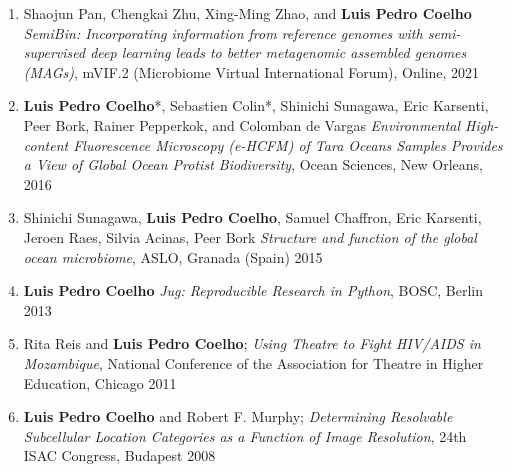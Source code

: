 \documentclass{article}
\begin{document}
\begin{enumerate}
\item Shaojun Pan, Chengkai Zhu, Xing-Ming Zhao, and \textbf{Luis Pedro
Coelho} \emph{SemiBin: Incorporating information from reference genomes with
semi-supervised deep learning leads to better metagenomic assembled genomes
(MAGs)}, mVIF.2 (Microbiome Virtual International Forum), Online, 2021
\item \textbf{Luis Pedro Coelho}*, Sebastien Colin*, Shinichi Sunagawa, Eric
Karsenti, Peer Bork, Rainer Pepperkok, and Colomban de Vargas
\emph{Environmental High-content Fluorescence Microscopy (e-HCFM) of Tara
Oceans Samples Provides a View of Global Ocean Protist Biodiversity}, Ocean
Sciences, New Orleans, 2016
\item Shinichi Sunagawa, \textbf{Luis Pedro Coelho}, Samuel Chaffron, Eric
Karsenti, Jeroen Raes, Silvia Acinas, Peer Bork \emph{Structure and function of
the global ocean microbiome}, ASLO, Granada (Spain) 2015
\item \textbf{Luis Pedro Coelho} \emph{Jug: Reproducible Research in Python},
BOSC, Berlin 2013
\item Rita Reis and \textbf{Luis Pedro Coelho}; \emph{Using Theatre to Fight
HIV/AIDS in Mozambique}, National Conference of the Association for Theatre in
Higher Education, Chicago 2011
\item \textbf{Luis Pedro Coelho} and Robert F. Murphy; \emph{Determining
Resolvable Subcellular Location Categories as a Function of Image Resolution},
24th ISAC Congress, Budapest 2008
\end{enumerate}
\end{document}

